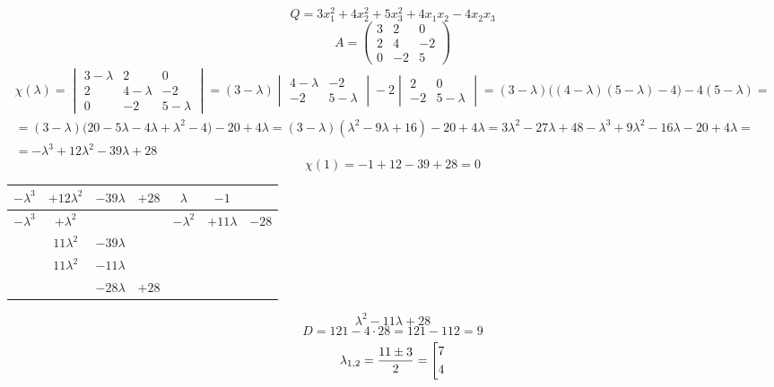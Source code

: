 $$ Q = 3x_1^2 + 4x_2^2 + 5x_3^2 + 4x_1x_2 - 4x_2x_3 $$
$$ A =
\begin{pmatrix}
	3 & 2 & 0 \\
    2 & 4 & -2 \\
    0 & -2 & 5
\end{pmatrix} $$
\begin{multline*}
	\chi(\lambda) =
    \begin{vmatrix}
    	3 - \lambda & 2 & 0 \\
        2 & 4 - \lambda & -2 \\
        0 & -2 & 5 - \lambda
    \end{vmatrix} = (3 - \lambda)
    \begin{vmatrix}
    	4 - \lambda & -2 \\
        -2 & 5 - \lambda
    \end{vmatrix} - 2
    \begin{vmatrix}
    	2 & 0 \\
        -2 & 5 - \lambda
    \end{vmatrix} = (3 - \lambda) \bigg( (4 - \lambda)(5 - \lambda) - 4 \bigg) - 4(5 - \lambda) = \\
    = (3 - \lambda) \bigg( 20 - 5\lambda - 4\lambda + \lambda^2 - 4 \bigg) - 20 + 4\lambda = (3 - \lambda)(\lambda^2 - 9\lambda + 16) - 20 + 4\lambda = 3\lambda^2 - 27\lambda + 48 - \lambda^3 + 9\lambda^2 - 16\lambda - 20 + 4\lambda = \\
    = -\lambda^3 + 12\lambda^2 - 39\lambda + 28
\end{multline*}
$$ \chi(1) = -1 + 12 - 39 + 28 = 0 $$
\begin{tabular}{c c c c | c c c}
	$ -\lambda^3 $ & $ +12\lambda^2 $ & $ -39\lambda $ & $ +28 $ & $ \lambda $ & $ -1 $ \\
    \hline
    $ -\lambda^3 $ & $ +\lambda^2 $ & & & $ -\lambda^2 $ & $ +11\lambda $ & $ -28 $ \\
    \hline
    & $ 11\lambda^2 $ & $ -39\lambda $ & & \\
    & $ 11\lambda^2 $ & $ -11\lambda $ & & \\
    \hline
    & & $ -28\lambda $ & $ +28 $
\end{tabular}
$$ \lambda^2 - 11\lambda + 28 $$
$$ D = 121 - 4 \cdot 28 = 121 - 112 = 9 $$
$$ \lambda_{1, 2} = \half[11 \pm 3] = \left[
\begin{aligned}
	7 \\
    4
\end{aligned} \right. $$
